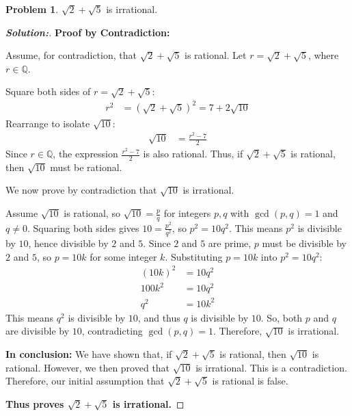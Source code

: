 \documentclass[12pt]{article}
\theoremstyle{definition}\newtheorem{problem}{Problem}
\newenvironment{solution}{\begin{proof}[\bfseries\textup{Solution:}]}{\end{proof}}
\newcommand{\Q}{\mathbb{Q}}
\begin{document}
\newpage
\begin{problem}
    $\sqrt{2} + \sqrt{5}$ is irrational.
\end{problem}
\begin{solution}
 
    \textbf{Proof by Contradiction:}

    Assume, for contradiction, that $\sqrt2+\sqrt5$ is rational.
    Let $r = \sqrt2+\sqrt5$, where $r \in \Q$.
    

    Square both sides of $r = \sqrt2+\sqrt5$:
    \begin{align*} r^2 &= (\sqrt2+\sqrt5)^2 = 7 + 2\sqrt{10} \end{align*}
    Rearrange to isolate $\sqrt{10}$:
    \begin{align*} \sqrt{10} &= \frac{r^2 - 7}{2} \end{align*}
    Since $r \in \Q$, the expression $\frac{r^2 - 7}{2}$ is also rational.
    Thus, if $\sqrt2+\sqrt5$ is rational, then $\sqrt{10}$ must be rational.
    
    We now prove by contradiction that $\sqrt{10}$ is irrational.

    Assume $\sqrt{10}$ is rational, so $\sqrt{10} = \frac{p}{q}$ for integers $p, q$ with $\gcd(p,q) = 1$ and $q \neq 0$.
    Squaring both sides gives $10 = \frac{p^2}{q^2}$, so $p^2 = 10q^2$.
    This means $p^2$ is divisible by $10$, hence divisible by $2$ and $5$. Since $2$ and $5$ are prime, $p$ must be divisible by $2$ and $5$, so $p = 10k$ for some integer $k$.
    Substituting $p=10k$ into $p^2 = 10q^2$:
    \begin{align*} (10k)^2 &= 10q^2 \\ 100k^2 &= 10q^2 \\ q^2 &= 10k^2 \end{align*}
    This means $q^2$ is divisible by $10$, and thus $q$ is divisible by $10$.
    So, both $p$ and $q$ are divisible by $10$, contradicting $\gcd(p,q) = 1$.
    Therefore, $\sqrt{10}$ is irrational.


    \textbf{In conclusion: }
    We have shown that,  if $\sqrt2+\sqrt5$ is rational, then $\sqrt{10}$ is rational.
    However, we then proved that $\sqrt{10}$ is irrational.
    This is a contradiction.
    Therefore, our initial assumption that $\sqrt2+\sqrt5$ is rational is false.

    
    \textbf{Thus proves $\sqrt2+\sqrt5$ is irrational. } 


\end{solution}
\end{document}
